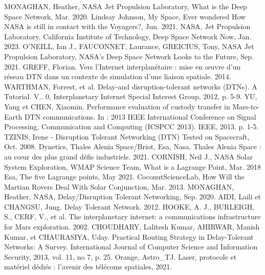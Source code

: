 \documentclass[conference]{IEEEtran}
\begin{document}
\begin{thebibliography}{00}
 MONAGHAN, Heather, NASA Jet Propulsion Laboratory, What is the Deep Space Network, Mar. 2020.
 Lindsay Johnson, My Space, Ever wondered How NASA is still in contact with the Voyagers?, Jun. 2021.
 NASA, Jet Propulsion Laboratory, California Institute of Technology, Deep Space Network Now, Jan. 2023.
 O'NEILL, Ian J., FAUCONNET, Laurance, GREICIUS, Tony, NASA Jet Propulsion Laboratory, NASA’s Deep Space Network Looks to the Future, Sep. 2021.
 GREFF, Florian. Vers l’Internet interplanétaire : mise en œuvre d’un réseau DTN dans un contexte de simulation d’une liaison spatiale. 2014.
 WARTHMAN, Forrest, et al. Delay-and disruption-tolerant networks (DTNs). A Tutorial. V.. 0, Interplanetary Internet Special Interest Group, 2012, p. 5-9.
 YU, Yang et CHEN, Xiaomin. Performance evaluation of custody transfer in Mars-to-Earth DTN communications. In : 2013 IEEE International Conference on Signal Processing, Communication and Computing (ICSPCC 2013). IEEE, 2013. p. 1-5.
 TZINIS, Irene - Disruption Tolerant Networking (DTN) Tested on Spacecraft, Oct. 2008.
 Dynetics, Thales Alenia Space/Briot, Esa, Nasa. Thales Alenia Space : au cœur des plus grand
défis industriels. 2021.
 CORNISH, Neil J., NASA Solar System Exploration, WMAP Science Team, What is a Lagrange Point, Mar. 2018
 Esa, The five Lagrange points, May 2021.
 CoconutScienceLab, How Will the Martian Rovers Deal With Solar Conjunction, Mar. 2013.
 MONAGHAN, Heather, NASA, Delay/Disruption Tolerant Networking, Sep. 2020.
 AIDI, Laili et CHANGSU, Jung. Delay Tolerant Network. 2012.
 HOOKE, A. J., BURLEIGH, S., CERF, V., et al. The interplanetary internet: a communications infrastructure for Mars exploration. 2002.
 CHOUDHARY, Lalitesh Kumar, AHIRWAR, Manish Kumar, et CHAURASIYA, Uday. Practical Routing Strategy in Delay-Tolerant Networks: A Survey. International Journal of Computer Science and Information Security, 2013, vol. 11, no 7, p. 25.
 Orange, Astro\_TJ. Laser, protocole et matériel dédiés : l’avenir des télécoms spatiales, 2021.
\end{thebibliography}
\end{document}
